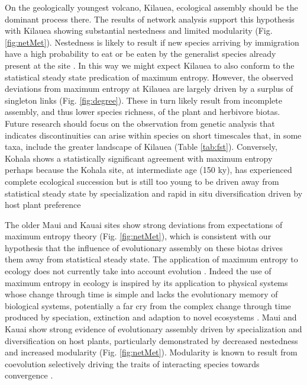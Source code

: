 \documentclass[12pt]{article}
\begin{document}
\begin{linenumbers}
On the geologically youngest volcano, Kilauea, ecological assembly
should be the dominant process there. The results of network analysis
support this hypothesis with Kilauea showing substantial nestedness
and limited modularity (Fig. \ref{fig:netMet}). Nestedness is likely
to result if new species arriving by immigration have a high
probability to eat or be eaten by the generalist species already
present at the site \citep{Bascompte2003}. In this way we might expect
Kilauea to also conform to the statistical steady state predication of
maximum entropy. However, the observed deviations from maximum entropy
at Kilauea are largely driven by a surplus of singleton links (Fig.
\ref{fig:degree}). These in turn likely result from incomplete
assembly, and thus lower species richness, of the plant and herbivore
biotas. Future research should focus on the observation from genetic
analysis that indicates discontinuities can arise within species on
short timescales that, in some taxa, include the greater landscape of
Kilauea (Table \ref{tab:fst}).  Conversely, Kohala shows a
statistically significant agreement with maximum entropy perhaps
because the Kohala site, at intermediate age (150 ky), has experienced
complete ecological succession but is still too young to be driven
away from statistical steady state by specialization and rapid in situ
diversification driven by host plant preference

The older Maui and Kauai sites show strong deviations from
expectations of maximum entropy theory (Fig. \ref{fig:netMet}), which
is consistent with our hypothesis that the influence of evolutionary
assembly on these biotas drives them away from statistical steady
state. The application of maximum entropy to ecology does not
currently take into account evolution \citep{harte2011}. Indeed the
use of maximum entropy in ecology is inspired by its application to
physical systems whose change through time is simple and lacks the
evolutionary memory of biological systems, potentially a far cry from
the complex change through time produced by speciation, extinction and
adaption to novel ecosystems \citep{eldredge1989}. Maui
and Kauai show strong evidence of evolutionary assembly driven by
specialization and diversification on host plants, particularly
demonstrated by decreased nestedness and increased modularity
(Fig. \ref{fig:netMet}). Modularity is known to result from
coevolution selectively driving the traits of interacting species
towards convergence \citep{Donatti2011, Nuismer2013}.


\end{linenumbers}
\end{document}
